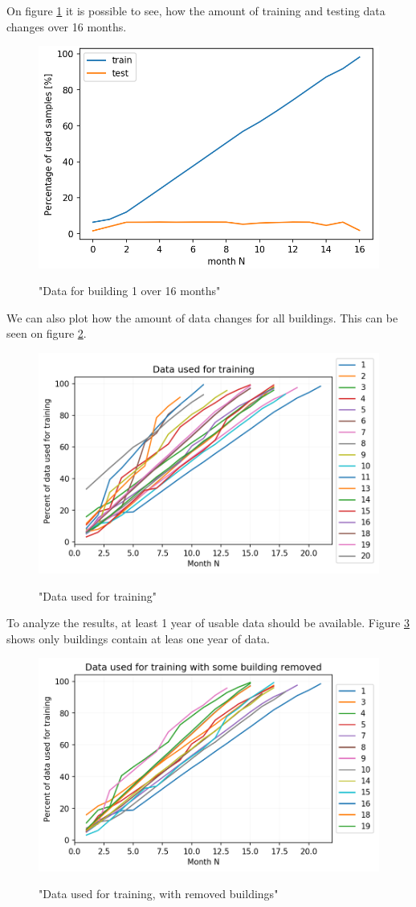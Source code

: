 On figure \ref{fig:dyn_data_1} it is possible to see,
how the amount of training and testing data changes over 16 months.

\begin{figure}[H]
	\centering
	\caption{"Data for building 1 over 16 months"}
	\includegraphics[width=.7\textwidth]{Figures/EC/DYN/tst_tr_b1.png}
	\label{fig:dyn_data_1}
\end{figure}

We can also plot how the amount of data changes for all buildings.
This can be seen on figure \ref{fig:data_used_for_training}.

\begin{figure}[H]
	\centering
	\caption{"Data used for training"}
	\includegraphics[width=.7\textwidth]{Figures/EC/DYN/data_used_for_training_all.png}
	\label{fig:data_used_for_training}
\end{figure}

To analyze the results, at least 1 year of usable data should be available. 
Figure \ref{fig:data_used_for_training_removed} shows only buildings contain at leas one year of data.
\begin{figure}[H]
	\centering
	\caption{"Data used for training, with removed buildings"}
	\includegraphics[width=.7\textwidth]{Figures/EC/DYN/data_used_for_training_removed_short.png}
	\label{fig:data_used_for_training_removed}
\end{figure}

